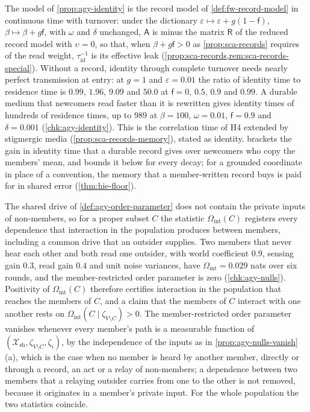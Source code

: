 The model of \cref{prop:agy-identity} is the record model of \cref{def:fw-record-model} in continuous time with turnover: under the dictionary $\varepsilon\mapsto\varepsilon+g(1-\mathsf f)$, $\beta\mapsto\beta+g\mathsf f$, with $\omega$ and $\delta$ unchanged, $\mathsf A$ is minus the matrix $\mathsf R$ of the reduced record model with $\upsilon=0$, so that, when $\beta+g\mathsf f>0$ as \cref{prop:sca-records} requires of the read weight, $\tau_{\mathrm{id}}^{-1}$ is its effective leak (\cref{prop:sca-records,rem:sca-records-special}). Without a record, identity through complete turnover needs nearly perfect transmission at entry: at $g=1$ and $\varepsilon=0.01$ the ratio of identity time to residence time is $0.99$, $1.96$, $9.09$ and $50.0$ at $\mathsf f=0$, $0.5$, $0.9$ and $0.99$. A durable medium that newcomers read faster than it is rewritten gives identity times of hundreds of residence times, up to $989$ at $\beta=100$, $\omega=0.01$, $\mathsf f=0.9$ and $\delta=0.001$ (\cref{chk:agy-identity}). This is the correlation time of H4 extended by stigmergic media (\cref{prop:sca-records-memory}), stated as identity.  brackets the gain in identity time that a durable record gives over newcomers who copy the members' mean, and bounds it below for every decay; for a grounded coordinate in place of a convention, the memory that a member-written record buys is paid for in shared error (\cref{thm:hie-floor}).

The shared drive of \cref{def:agy-order-parameter} does not contain the private inputs of non-members, so for a proper subset $C$ the statistic $\Omega_{\mathrm{int}}(C)$ registers every dependence that interaction in the population produces between members, including a common drive that an outsider supplies. Two members that never hear each other and both read one outsider, with world coefficient $0.9$, sensing gain $0.3$, read gain $0.4$ and unit noise variances, have $\Omega_{\mathrm{int}}=0.029$ nats over six rounds, and the member-restricted order parameter is zero (\cref{chk:agy-nulls}). Positivity of $\Omega_{\mathrm{int}}(C)$ therefore certifies interaction in the population that reaches the members of $C$, and a claim that the members of $C$ interact with one another rests on $\Omega_{\mathrm{int}}(C\mid\zeta_{V\setminus C})>0$. The member-restricted order parameter vanishes whenever every member's path is a measurable function of $(\mathcal X_{\mathrm{sh}},\zeta_{V\setminus C},\zeta_i)$, by the independence of the inputs as in \cref{prop:agy-nulls-vanish}(a), which is the case when no member is heard by another member, directly or through a record, an act or a relay of non-members; a dependence between two members that a relaying outsider carries from one to the other is not removed, because it originates in a member's private input. For the whole population the two statistics coincide.

